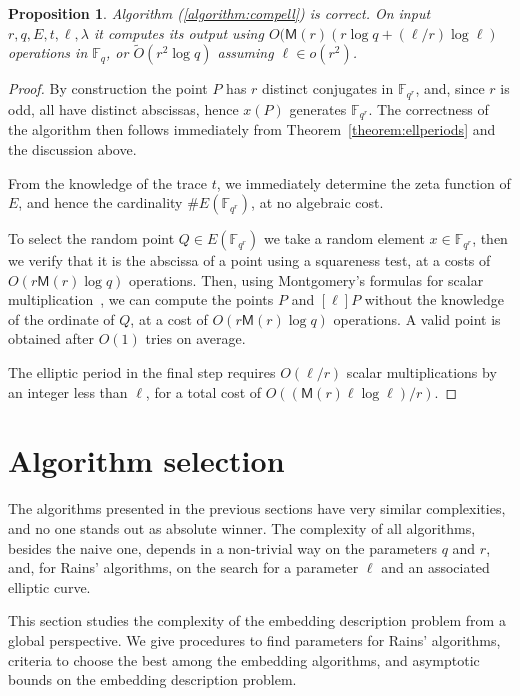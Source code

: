 \documentclass[12pt]{article}
\theoremstyle{plain}
\newtheorem{proposition}[theorem]{Proposition}
\theoremstyle{definition}
\newcommand{\tildO}{\tilde{O}}
\def\F{\ensuremath{\mathbb{F}}}
\def\MM{\ensuremath{\mathsf{M}}}
\newcounter{algorithm}
\begin{document}
\begin{proposition}
  Algorithm (\ref{algorithm:compell}) is correct. On input
  $r,q,E,t,\ell,\lambda$ it computes its output using
  $O(\MM(r)(r\log{q} + (\ell/r)\log{\ell})$ operations in $\F_q$, or
  $\tildO(r^2\log q)$ assuming $\ell\in o(r^2)$.
\end{proposition}
\begin{proof}
  By construction the point $P$ has $r$ distinct conjugates in
  $\F_{q^r}$, and, since $r$ is odd, all have distinct abscissas,
  hence $x(P)$ generates $\F_{q^r}$.  The correctness of the algorithm
  then follows immediately from Theorem~\ref{theorem:ellperiods} and
  the discussion above.

  From the knowledge of the trace $t$, we immediately determine the
  zeta function of $E$, and hence the cardinality $\# E(\F_{q^r})$, at
  no algebraic cost.

  To select the random point $Q\in E(\F_{q^r})$ we take a random
  element $x\in\F_{q^r}$, then we verify that it is the abscissa of a
  point using a squareness test, at a costs of $O(r\MM(r)\log q)$
  operations. Then, using Montgomery's formulas for scalar
  multiplication~\cite{montgomery}, we can compute the points $P$ and
  $[\ell]P$ without the knowledge of the ordinate of $Q$, at a cost of
  $O(r\MM(r)\log q)$ operations. A valid point is obtained after
  $O(1)$ tries on average.

  The elliptic period in the final step requires $O(\ell/r)$ scalar
  multiplications by an integer less than $\ell$, for a total cost of
  $O((\MM(r)\ell\log\ell)/r)$.
\end{proof}


\section{Algorithm selection}
\label{sec:selection}

The algorithms presented in the previous sections have very similar
complexities, and no one stands out as absolute winner. The complexity
of all algorithms, besides the naive one, depends in a non-trivial way
on the parameters $q$ and $r$, and, for Rains' algorithms, on the
search for a parameter $\ell$ and an associated elliptic curve.

This section studies the complexity of the embedding description
problem from a global perspective. We give procedures to find
parameters for Rains' algorithms, criteria to choose the best among
the embedding algorithms, and asymptotic bounds on the embedding
description problem.
\end{document}
